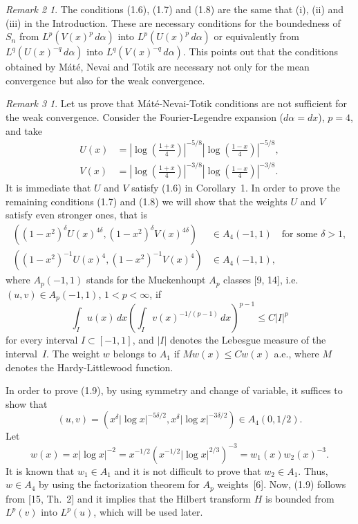 \documentclass[10pt,a4paper]{article}
\theoremstyle{plain}
\theoremstyle{remark}
\newtheorem*{remTwo}{Remark 2}
\newtheorem*{remThree}{Remark 3}
\begin{document}
\begin{remTwo}
The conditions (1.6), (1.7) and (1.8) are the
same that (i), (ii) and (iii) in the Introduction. These are necessary
conditions for the boundedness of $S_{n}$ from $L^{p}(V(x)^{p}\,d\alpha)$
into $L^{p}(U(x)^{p}\,d\alpha)$ or equivalently from $L^{q}(U(x)^{-q}\,d\alpha)$
into $L^{q}(V(x)^{-q}\,d\alpha)$. This points out that the conditions
obtained by M\'{a}t\'{e}, Nevai and Totik are necessary not only
for the mean convergence but also for the weak convergence.
\end{remTwo}

\begin{remThree}
Let us prove that M\'{a}t\'{e}-Nevai-Totik conditions
are not sufficient for the weak convergence. Consider the Fourier-Legendre
expansion ($d\alpha = dx$), $p = 4$, and take
\begin{align*}
U(x) &= \left|\log \left( \frac{1+x}{4} \right) \right|^{-5/8}
\left|\log \left( \frac{1-x}{4} \right) \right|^{-5/8}, \\
V(x) &= \left|\log \left( \frac{1+x}{4} \right) \right|^{-3/8}
\left|\log \left( \frac{1-x}{4} \right) \right|^{-3/8}.
\end{align*}
It is immediate that $U$ and $V$ satisfy (1.6) in Corollary~1. In
order to prove the remaining conditions (1.7) and (1.8) we will
show that the weights $U$ and $V$ satisfy even stronger ones, that
is
\begin{align}
((1-x^{2})^{\delta} U(x)^{4\delta}, (1-x^{2})^{\delta} V(x)^{4\delta})
&\in A_{4}(-1,1) \quad\text{for some }\delta > 1,
\tag{1.9}\\
((1-x^{2})^{-1} U(x)^{4}, (1-x^{2})^{-1} V(x)^{4})
&\in A_{4}(-1,1),
\tag{1.10}
\end{align}
where $A_{p}(-1,1)$ stands for the Muckenhoupt $A_{p}$ classes [9, 14],
i.e.\ $(u,v) \in A_{p}(-1,1)$, $1 < p < \infty$, if
$$
\int_{I} u(x)\,dx \left( \int_{I} v(x)^{-1/(p-1)}\,dx \right)^{p-1}
\leq C|I|^{p}
$$
for every interval $I \subset [-1,1]$, and $|I|$
denotes the Lebesgue measure of the interval~$I$. The weight $w$
belongs to $A_{1}$ if $Mw(x) \leq Cw(x)$ a.e., where $M$ denotes
the Hardy-Littlewood function.

In order to prove (1.9), by using symmetry and change of variable,
it suffices to show that
$$
(u,v) = (x^{\delta} |\log x|^{-5\delta/2}, x^{\delta} |\log x|^{-3\delta/2})
\in A_{4}(0,1/2).
$$
Let
$$
w(x) = x|\log x|^{-2} = x^{-1/2} \left(x^{-1/2} |\log x|^{2/3} \right)^{-3}
= w_{1}(x)w_{2}(x)^{-3}.
$$
It is known that $w_{1} \in A_{1}$ and it is not difficult to
prove that $w_{2} \in A_{1}$. Thus, $w \in A_{4}$ by using
the factorization theorem for $A_{p}$ weights~[6]. Now, (1.9) follows
from [15, Th.~2] and it implies that the Hilbert transform $H$
is bounded from $L^{p}(v)$ into $L^{p}(u)$, which will be used later.


\end{remThree}
\end{document}
